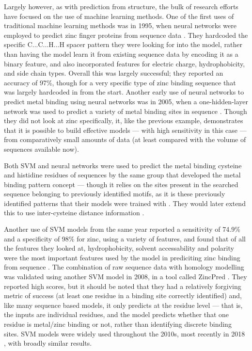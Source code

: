 Largely however, as with prediction from structure, the bulk of research efforts have focused on the use of machine learning methods. One of the first uses of traditional machine learning methods was in 1995, when neural networks were employed to predict zinc finger proteins from sequence data \cite{nakata1995prediction}. They hardcoded the specific C...C...H...H spacer pattern they were looking for into the model, rather than having the model learn it from existing sequence data by encoding it as a binary feature, and also incorporated features for electric charge, hydrophobicity, and side chain types. Overall this was largely successful; they reported an accuracy of 97\%, though for a very specific type of zinc binding sequence that was largely hardcoded in from the start. Another early use of neural networks to predict metal binding using neural networks was in 2005, when a one-hidden-layer network was used to predict a variety of metal binding sites in sequence \cite{lin2005protein}. Though they did not look at zinc specifically, it, like the previous example, demonstrates that it is possible to build effective models --- with high sensitivity in this case --- from comparatively small amounts of data (at least compared with the volume of sequences available now).

Both SVM and neural networks were used to predict the metal binding cysteine and histidine residues of sequences by the same group that developed the metal binding pattern concept --- though it relies on the sites present in the searched sequence belonging to previously identified motifs, as it is these previously identified patterns that their models were trained with \cite{passerini2006identifying}. They would later extend this to use inter-cysteine distance information \cite{passerini2007predicting}.

Another use of SVM models from the same year reported a sensitivity of 74.9\% and a specificity of 98\% for zinc, using a variety of features, and found that of all the features they looked at, hydrophobicity, solvent accessability and polarity were the most important features used by the model in prediciting zinc binding from sequence \cite{lin2006prediction}. The combination of raw sequence data with homology modelling was validated using another SVM model in 2008, in a tool called ZincPred \cite{shu2008prediction}. They reported high scores, but it should be noted that they had a relatively forgiving metric of success (at least one residue in a binding site correctly identified) and, like many sequence based models, it only predicts at the residue level --- that is, the inputs are individual residues, and the model predicts whether that one residue is metal/zinc binding or not, rather than identifying discrete binding sites. SVM models were widely used throughout the 2010s, most recently in 2018 \cite{srivastava2018prediction}, with broadly similar results.

